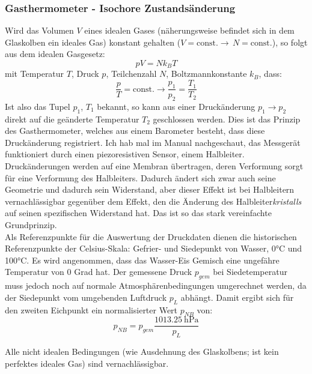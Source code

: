 \subsubsection{Gasthermometer - Isochore Zustandsänderung}
Wird das Volumen \(V\) eines idealen Gases (näherungsweise befindet sich in dem Glaskolben ein ideales Gas) konstant gehalten (\(V=\text{const.}\rightarrow\,N=\text{const.}\)), so folgt aus dem idealen Gasgesetz:
\begin{equation}
    pV=Nk_BT
\end{equation} 
mit Temperatur \(T\), Druck \(p\), Teilchenzahl \(N\), Boltzmannkonstante \(k_B\), dass:
\begin{equation}
    \frac{p}{T}=\text{const.}
    \rightarrow \frac{p_1}{p_2}=\frac{T_1}{T_2}
    \label{eq:Druck}
\end{equation}
Ist also das Tupel \(p_1\), \(T_1\) bekannt, so kann aus einer Druckänderung \(p_1\rightarrow p_2\) direkt auf die geänderte Temperatur \(T_2\) geschlossen werden. Dies ist das Prinzip des Gasthermometer, welches aus einem Barometer besteht, dass diese Druckänderung registriert. Ich hab mal im Manual \autocite{manual_41} nachgeschaut, das Messgerät funktioniert durch einen \glqq piezoresistiven\grqq{} Sensor, einem Halbleiter. Druckänderungen werden auf eine Membran übertragen, deren Verformung sorgt für eine Verformung des Halbleiters. Dadurch ändert sich zwar auch seine Geometrie und dadurch sein Widerstand, aber dieser Effekt ist bei Halbleitern vernachlässigbar gegenüber dem Effekt, den die Änderung des Halbleiter\emph{kristalls} auf seinen spezifischen Widerstand hat. Das ist so das stark vereinfachte Grundprinzip.\\
Als Referenzpunkte für die Auswertung der Druckdaten dienen die historischen Referenzpunkte der Celsius-Skala: Gefrier- und Siedepunkt von Wasser, 0\unit{\degreeCelsius} und 100\unit{\degreeCelsius}. Es wird angenommen, dass das Wasser-Eis Gemisch eine ungefähre Temperatur von 0 Grad hat. Der gemessene Druck \(p_{gem}\) bei Siedetemperatur muss jedoch noch auf normale Atmosphärenbedingungen umgerechnet werden, da der Siedepunkt vom umgebenden Luftdruck \(p_{L}\) abhängt. Damit ergibt sich für den zweiten Eichpunkt ein normalisierter Wert \(p_{NB}\) von:
\begin{equation}
    p_{NB}=p_{gem}\frac{\qty{1013.25}{\hecto\pascal}}{p_L}
    \label{eq:Druck_Normal}
\end{equation}

Alle nicht idealen Bedingungen (wie Ausdehnung des Glaskolbens;  ist kein perfektes ideales Gas) sind vernachlässigbar.


